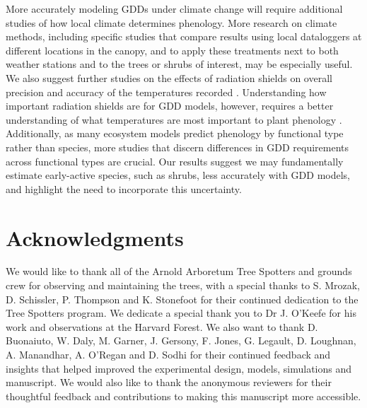\documentclass{article}\usepackage[]{graphicx}\usepackage[]{color}
\begin{document}
More accurately modeling GDDs under climate change will require additional studies of how local climate determines phenology. More research on climate methods, including specific studies that compare results using local dataloggers at different locations in the canopy, and to apply these treatments next to both weather stations and to the trees or shrubs of interest, may be especially useful. We also suggest further studies on the effects of radiation shields on overall precision and accuracy of the temperatures recorded \citep{daCunha2015}. Understanding how important radiation shields are for GDD models, however, requires a better understanding of what temperatures are most important to plant phenology \citep[e.g., bud temperature, including influences of bud color and structure and their interaction with solar radiation, versus air temperature,][]{Vitasse2021}. Additionally, as many ecosystem models predict phenology by functional type rather than species, more studies that discern differences in GDD requirements across functional types are crucial. Our results suggest we may fundamentally estimate early-active species, such as shrubs, less accurately with GDD models, and highlight the need to incorporate this uncertainty. 


\section*{Acknowledgments}
We would like to thank all of the Arnold Arboretum Tree Spotters and grounds crew for observing and maintaining the trees, with a special thanks to S. Mrozak, D. Schissler, P. Thompson and K. Stonefoot for their continued dedication to the Tree Spotters program. We dedicate a special thank you to Dr J. O'Keefe for his work and observations at the Harvard Forest. We also want to thank D. Buonaiuto, W. Daly, M. Garner, J. Gersony, F. Jones, G. Legault, D. Loughnan, A. Manandhar, A. O'Regan and D. Sodhi for their continued feedback and insights that helped improved the experimental design, models, simulations and manuscript. We would also like to thank the anonymous reviewers for their thoughtful feedback and contributions to making this manuscript more accessible. 
\end{document}
